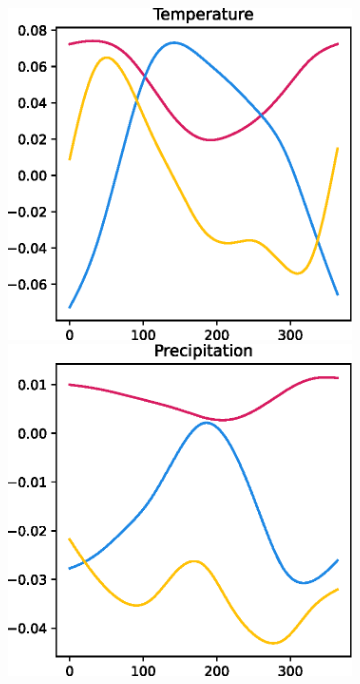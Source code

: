 \begin{figure}
    \centering
    \begin{subfigure}[b]{0.3\textwidth}
    \centering
    \includegraphics[width=\textwidth]{eigen_temp_gram.eps}
    \includegraphics[width=\textwidth]{eigen_prec_gram.eps}

\end{subfigure}
\end{figure}
